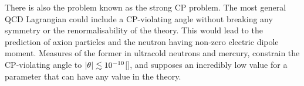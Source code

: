 There is also the problem known as the strong CP problem. The most general QCD Lagrangian could include a CP-violating angle without breaking any symmetry or the renormalisability of the theory. This would lead to the prediction of axion particles and the neutron having non-zero electric dipole moment. Measures of the former in ultracold neutrons and mercury, constrain the CP-violating angle to $\abs{\theta}\lesssim10^{-10}$[], and supposes an incredibly low value for a parameter that can have any value in the theory.